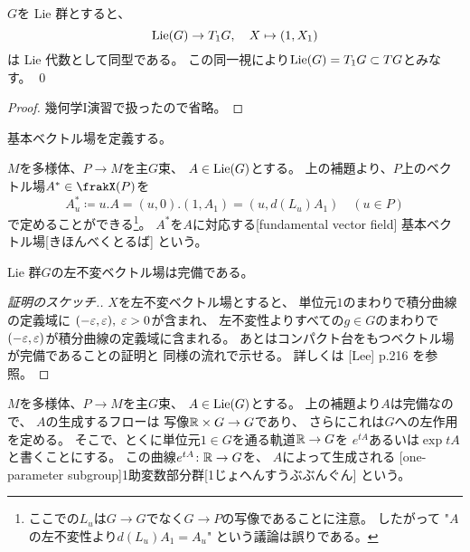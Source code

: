 \documentclass[report]{jlreq}
\begin{document}
\begin{lemma}
    $G$を Lie 群とすると、
    \begin{equation}
        \operatorname{Lie}(G) \to T_1G,
        \quad
        X \mapsto (1, X_1)
    \end{equation}
    は Lie 代数として同型である。
    この同一視により$\operatorname{Lie}(G) = T_1G \subset TG$とみなす。
    \qed
\end{lemma}

\begin{proof}
    幾何学I演習で扱ったので省略。
\end{proof}

基本ベクトル場を定義する。

\begin{definition}[基本ベクトル場]
    $M$を多様体、$P \to M$を主$G$束、
    $A \in \operatorname{Lie}(G)$とする。
    上の補題より、$P$上のベクトル場$A^* \in \frakX(P)$を
    \begin{equation}
        A^*_u \coloneqq u . A = (u, 0) . (1, A_1) = (u, d(L_u) A_1)
        \quad (u \in P)
    \end{equation}
    で定めることができる\footnote{
        ここでの$L_u$は$G \to G$でなく$G \to P$の写像であることに注意。
        したがって "$A$の左不変性より$d(L_u) A_1 = A_u$" という議論は誤りである。
    }。
    $A^*$を$A$に対応する[fundamental vector field]
    {基本ベクトル場}[きほんべくとるば]
    という。
\end{definition}

\begin{lemma}[左不変ベクトル場は完備]
    Lie 群$G$の左不変ベクトル場は完備である。
\end{lemma}

\begin{proof}[証明のスケッチ.]
    $X$を左不変ベクトル場とすると、
    単位元$1$のまわりで積分曲線の定義域に
    $(-\varepsilon, \varepsilon), \; \varepsilon > 0$が含まれ、
    左不変性よりすべての$g \in G$のまわりで
    $(-\varepsilon, \varepsilon)$が積分曲線の定義域に含まれる。
    あとはコンパクト台をもつベクトル場が完備であることの証明と
    同様の流れで示せる。
    詳しくは [Lee] p.216 を参照。
\end{proof}

\begin{definition}[1助変数部分群]
    $M$を多様体、$P \to M$を主$G$束、
    $A \in \operatorname{Lie}(G)$とする。
    上の補題より$A$は完備なので、
    $A$の生成するフローは
    {\smooth}写像$\mathbb{R} \times G \to G$であり、
    さらにこれは$G$への{\smooth}左作用を定める。
    そこで、とくに単位元$1 \in G$を通る軌道$\mathbb{R} \to G$を
    $e^{tA}$あるいは$\exp tA$と書くことにする。
    この曲線$e^{tA} \colon \mathbb{R} \to G$を、
    $A$によって生成される
    [one-parameter subgroup]{1助変数部分群}[1じょへんすうぶぶんぐん]
    という。
\end{definition}
\end{document}
